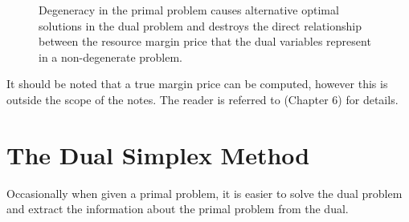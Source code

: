 \begin{example}
\begin{figure}[htbp]
\caption{Degeneracy in the primal problem causes alternative optimal solutions in the dual problem and destroys the direct relationship between the resource margin price that the dual variables represent in a non-degenerate problem.}
\label{fig:DegenDual}
\end{figure}

It should be noted that a true margin price can be computed, however this is outside the scope of the notes. The reader is referred to \cite{BJS04} (Chapter 6) for details.
\end{example}

\section{The Dual Simplex Method}
Occasionally when given a primal problem, it is easier to solve the dual problem and extract the information about the primal problem from the dual. 

